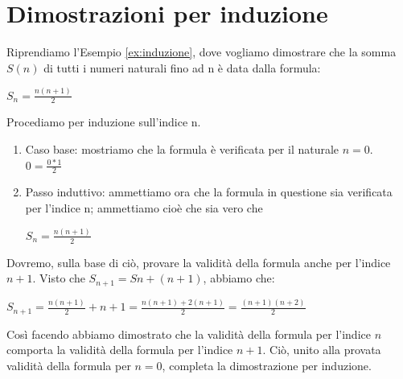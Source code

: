 \section*{Dimostrazioni per induzione}
\begin{example}
    Riprendiamo l'Esempio \ref{ex:induzione}, dove vogliamo dimostrare che la somma $S(n)$ di tutti i numeri naturali fino ad n è data dalla formula:
    \begin{center}
        $S_n=\frac{n(n+1)}{2}$
    \end{center}
    Procediamo per induzione sull’indice n.
    \begin{enumerate}
        \item Caso base: mostriamo che la formula è verificata per il naturale $n = 0$. $0=\frac{0*1}{2}$
        \item Passo induttivo: ammettiamo ora che la formula in questione sia verificata per l’indice n; ammettiamo cioè che sia vero che
        \begin{center}
            $S_n=\frac{n(n+1)}{2}$
        \end{center}
    \end{enumerate}
    Dovremo, sulla base di ciò, provare la validità della formula anche per l’indice $n +1$. Visto che $S_{n+1} = Sn + (n +1)$, abbiamo che:
    \begin{center}
        $S_{n+1}=\frac{n(n+1)}{2}+n+1=\frac{n(n+1)+2(n+1)}{2}=\frac{(n+1)(n+2)}{2}$
    \end{center}
    Così facendo abbiamo dimostrato che la validità della formula per l’indice $n$ comporta la validità della formula per l’indice $n + 1$. Ciò, unito alla provata validità della formula per $n = 0$, completa la dimostrazione per induzione.
\end{example}
